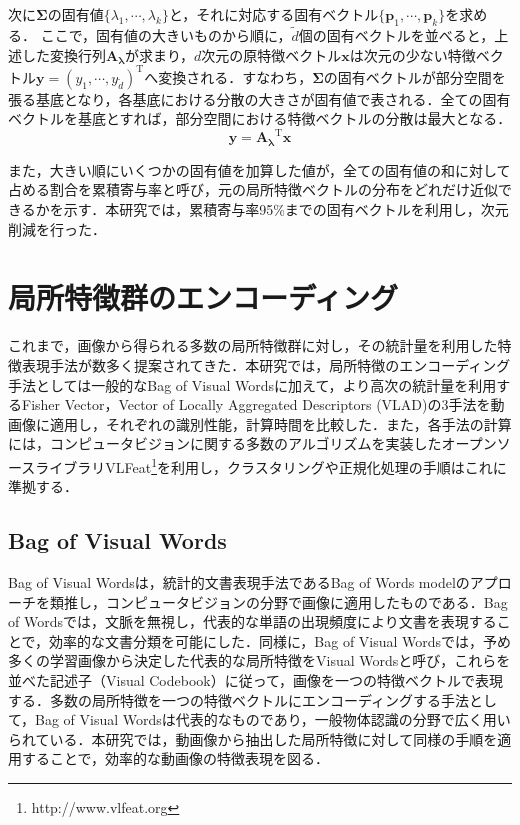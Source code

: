 次に$ \bm{\Sigma} $の固有値$ \{\lambda_1,\cdots,\lambda_k\} $と，それに対応する固有ベクトル$ \{\bm{p}_1,\cdots,\bm{p}_k\} $を求める．
ここで，固有値の大きいものから順に，$ \tilde{d} $個の固有ベクトルを並べると，上述した変換行列$ \bm{A_{\lambda}} $が求まり，$ d $次元の原特徴ベクトル$ \bm{x} $は次元の少ない特徴ベクトル$ \bm{y} = \left( y_1, \cdots, y_{\tilde{d}} \right)^{\mathrm{T}} $へ変換される．すなわち，$ \bm{\Sigma} $の固有ベクトルが部分空間を張る基底となり，各基底における分散の大きさが固有値で表される．全ての固有ベクトルを基底とすれば，部分空間における特徴ベクトルの分散は最大となる．
%
\begin{equation}
{
  \bm{y} = \bm{A_{\lambda}}^{\mathrm{T}}\bm{x}
}
\end{equation}

また，大きい順にいくつかの固有値を加算した値が，全ての固有値の和に対して占める割合を累積寄与率と呼び，元の局所特徴ベクトルの分布をどれだけ近似できるかを示す．本研究では，累積寄与率95\%までの固有ベクトルを利用し，次元削減を行った．

\newpage
\section{局所特徴群のエンコーディング}
これまで，画像から得られる多数の局所特徴群に対し，その統計量を利用した特徴表現手法が数多く提案されてきた．本研究では，局所特徴のエンコーディング手法としては一般的なBag of Visual Words\cite{bovw}に加えて，より高次の統計量を利用するFisher Vector\cite{fisher_vector}，Vector of Locally Aggregated Descriptors (VLAD)\cite{vlad}の3手法を動画像に適用し，それぞれの識別性能，計算時間を比較した．また，各手法の計算には，コンピュータビジョンに関する多数のアルゴリズムを実装したオープンソースライブラリVLFeat\footnote{http://www.vlfeat.org}を利用し，クラスタリングや正規化処理の手順はこれに準拠する．

\subsection{Bag of Visual Words}
Bag of Visual Words\cite{bovw}は，統計的文書表現手法であるBag of Words modelのアプローチを類推し，コンピュータビジョンの分野で画像に適用したものである．Bag of Wordsでは，文脈を無視し，代表的な単語の出現頻度により文書を表現することで，効率的な文書分類を可能にした．同様に，Bag of Visual Wordsでは，予め多くの学習画像から決定した代表的な局所特徴をVisual Wordsと呼び，これらを並べた記述子（Visual Codebook）に従って，画像を一つの特徴ベクトルで表現する．多数の局所特徴を一つの特徴ベクトルにエンコーディングする手法として，Bag of Visual Wordsは代表的なものであり，一般物体認識の分野で広く用いられている．本研究では，動画像から抽出した局所特徴に対して同様の手順を適用することで，効率的な動画像の特徴表現を図る．

